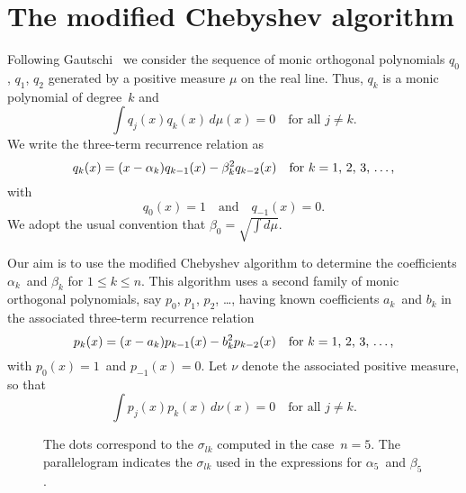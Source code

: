 \documentclass[12pt,a4paper]{article}
\begin{document}
\section{The modified Chebyshev algorithm}
Following Gautschi~\cite{Gautschi1982} we consider the sequence of 
monic orthogonal polynomials $q_0$, $q_1$, $q_2$ generated by a 
positive measure $\mu$ on the real line.  Thus, $q_k$ is a monic 
polynomial of degree~$k$ and
\[
\int q_j(x)q_k(x)\,d\mu(x)=0\quad\text{for all $j\ne k$.}
\]
We write the three-term recurrence relation as
\begin{equation}\label{eq: 3 term q}
q_k(x)=(x-\alpha_k)q_{k-1}(x)-\beta_k^2 q_{k-2}(x)
	\quad\text{for $k=1$, $2$, $3$, \dots,}
\end{equation}
with
\[
q_0(x)=1\quad\text{and}\quad q_{-1}(x)=0.
\]
We adopt the usual convention that $\beta_0=\sqrt{\int d\mu}$.

Our aim is to use the modified Chebyshev algorithm to determine the 
coefficients $\alpha_k$~and $\beta_k$ for $1\le k\le n$.
This algorithm uses a second family of monic orthogonal 
polynomials, say $p_0$, $p_1$, $p_2$, \dots, having known coefficients 
$a_k$~and $b_k$ 
in the associated three-term recurrence relation
\[
p_k(x)=(x-a_k)p_{k-1}(x)-b_k^2p_{k-2}(x)
	\quad\text{for $k=1$, $2$, $3$, \dots,}
\]
with $p_0(x)=1$~and $p_{-1}(x)=0$.  Let $\nu$ denote the associated 
positive measure, so that
\[
\int p_j(x)p_k(x)\,d\nu(x)=0\quad\text{for all $j\ne k$.}
\]

\begin{figure}
\caption{The dots correspond to the $\sigma_{lk}$ computed in the 
case~$n=5$.  The parallelogram indicates the $\sigma_{lk}$ used in 
the expressions for $\alpha_5$~and $\beta_5$.}
\begin{center}
\end{center}
\end{figure}
\end{document}
